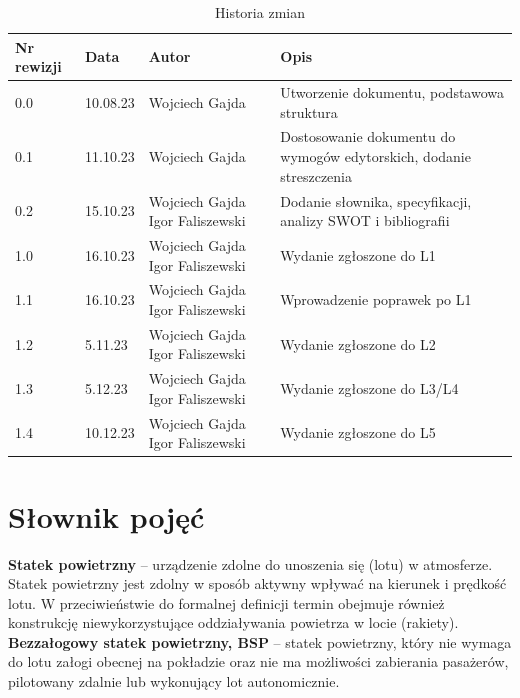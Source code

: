 \documentclass[15pt]{sprawozdanie}
\begin{document}
\renewcommand{\arraystretch}{1.5}
\begin{table}[!h]
\centering
\begin{tabular}{|m{}|m{}|m{}|m{}|} 
\hline
\rowcolor{Gray}
Nr rewizji & Data & Autor & Opis \\
 \hline
  0.0 & 10.08.23 & Wojciech Gajda & Utworzenie dokumentu, podstawowa struktura \\ 
\hline
  0.1 & 11.10.23 & Wojciech Gajda & Dostosowanie dokumentu do wymogów edytorskich, dodanie streszczenia \\ 
\hline
  0.2 & 15.10.23 & Wojciech Gajda \newline Igor Faliszewski & Dodanie  słownika, specyfikacji, analizy SWOT i bibliografii \\ 
\hline
  1.0 & 16.10.23 & Wojciech Gajda \newline Igor Faliszewski & Wydanie zgłoszone do L1 \\
\hline
  1.1 & 16.10.23 & Wojciech Gajda \newline Igor Faliszewski & Wprowadzenie poprawek po L1 \\
\hline
  1.2 & 5.11.23 & Wojciech Gajda \newline Igor Faliszewski & Wydanie zgłoszone do L2 \\
\hline
  1.3 & 5.12.23 & Wojciech Gajda \newline Igor Faliszewski & Wydanie zgłoszone do L3/L4 \\
\hline
  1.4 & 10.12.23 & Wojciech Gajda \newline Igor Faliszewski & Wydanie zgłoszone do L5 \\
\hline
\end{tabular}
\caption{Historia zmian}
\label{changelog}
\end{table}

\newpage

\section{Słownik pojęć}

\textbf{Statek powietrzny} -- urządzenie zdolne do unoszenia się (lotu) w atmosferze. Statek powietrzny jest zdolny w sposób aktywny wpływać na kierunek i prędkość lotu. W przeciwieństwie do formalnej definicji termin obejmuje również konstrukcję niewykorzystujące oddziaływania powietrza w locie (rakiety).\\

\textbf{Bezzałogowy statek powietrzny, BSP} -- statek powietrzny, który nie wymaga do lotu załogi obecnej na pokładzie oraz nie ma możliwości zabierania pasażerów, pilotowany zdalnie lub wykonujący lot autonomicznie.\\ 
\end{document}
